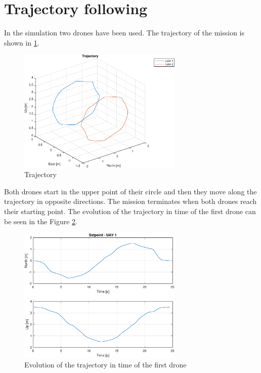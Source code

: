 \section{Trajectory following}

In the simulation two drones have been used. The trajectory of the mission is shown
in \ref{fig:trajectory}.

\begin{figure}
\centering
\includegraphics[width=0.7\textwidth]{chapters/chapter-04/figures/trajectory.eps}
\caption{Trajectory}
\label{fig:trajectory}
\end{figure}

Both drones start in the upper point of their circle and then they move along the
trajectory in opposite directions. The mission terminates when both drones reach
their starting point.
The evolution of the trajectory in time of the first drone can be seen in the Figure
\ref{fig:trajectory_during_time}.

\begin{figure}
\centering
\includegraphics[width=0.7\textwidth]{chapters/chapter-04/figures/pos.eps}
\caption{Evolution of the trajectory in time of the first drone}
\label{fig:trajectory_during_time}
\end{figure}

